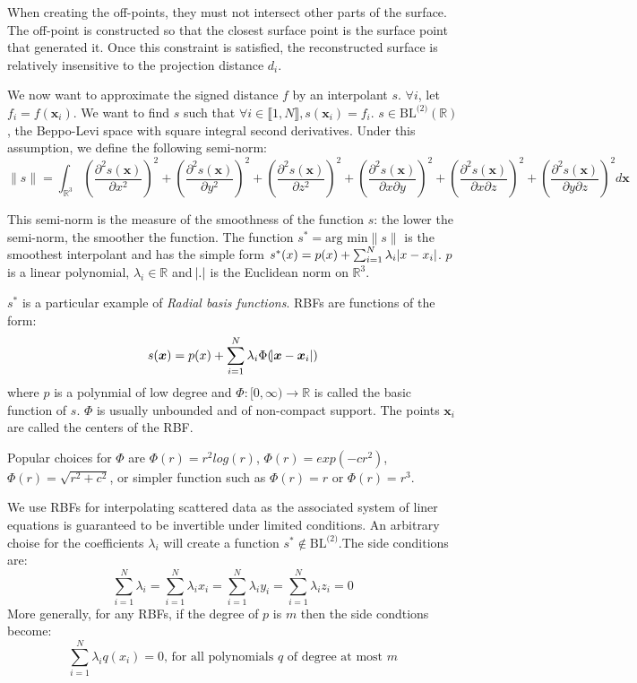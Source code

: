\documentclass[a4paper]{article}
\begin{document}
When creating the off-points, they must not intersect other parts of the surface. The off-point is constructed so that the closest surface point is the surface point that generated it. Once this constraint is satisfied, the reconstructed surface is relatively insensitive to the projection distance $d_i$.

We now want to approximate the signed distance $f$ by an interpolant $s$. $\forall i$, let $f_i = f(\boldsymbol{x}_i)$. We want to find $s$ such that $\forall i\in\llbracket 1,N\rrbracket, s(\boldsymbol{x}_i) = f_i$. $s \in \text{BL}^{\text{(2)}}(\mathbb{R})$, the Beppo-Levi space with square integral second derivatives. Under this assumption, we define the following semi-norm:
$$\|s\| = \int_{\mathbb{R}^3}\left(\frac{\partial^2s(\boldsymbol{x})}{\partial x^2}\right)^2 + \left(\frac{\partial^2s(\boldsymbol{x})}{\partial y^2}\right)^2 + \left(\frac{\partial^2s(\boldsymbol{x})}{\partial z^2}\right)^2 + \left(\frac{\partial^2s(\boldsymbol{x})}{\partial x\partial y}\right)^2 + \left(\frac{\partial^2s(\boldsymbol{x})}{\partial x\partial z}\right)^2 + \left(\frac{\partial^2s(\boldsymbol{x})}{\partial y\partial z}\right)^2 d\boldsymbol{x}$$

This semi-norm is the measure of the smoothness of the function $s$: the lower the semi-norm, the smoother the function. The function $s^* = \text{arg min} \|s\|$ is the smoothest interpolant and has the simple form $s^*(x) = p(x) + \sum_{i = 1}^{N}\lambda_i\abs{x - x_i}$. $p$ is a linear polynomial, $\lambda_i \in \mathbb{R}$ and $\abs{.}$ is the Euclidean norm on $\mathbb{R}^3$.

$s^*$ is a particular example of \emph{Radial basis functions}. RBFs are functions of the form:
$$s(\boldsymbol{x}) = p(x) + \sum_{i=1}^{N}\lambda_i\Phi(\abs{\boldsymbol{x} - \boldsymbol{x}_i})$$
where $p$ is a polynmial of low degree and $\Phi:[0,\infty) \to \mathbb{R}$ is called the basic function of $s$. $\Phi$ is usually unbounded and of non-compact support. The points $\boldsymbol{x}_i$ are called the centers of the RBF.

Popular choices for $\Phi$ are $\Phi(r) = r^2log(r)$, $\Phi(r) = exp(-cr^2)$, $\Phi(r) = \sqrt{r^2+c^2}$, or simpler function such as $\Phi(r) = r$ or $\Phi(r) = r^3$.

We use RBFs for interpolating scattered data as the associated system of liner equations is guaranteed to be invertible under limited conditions. An arbitrary choise for the coefficients $\lambda_i$ will create a function $s^* \notin \text{BL}^{\text{(2)}}$.The side conditions are:
$$\sum_{i = 1}^{N}\lambda_i =  \sum_{i = 1}^{N}\lambda_i x_i = \sum_{i = 1}^{N}\lambda_i y_i =\sum_{i = 1}^{N}\lambda_i z_i = 0$$
More generally, for any RBFs, if the degree of $p$ is $m$ then the side condtions become:
$$\sum_{i = 1}^{N}\lambda_i q(x_i) = 0\text{, for all polynomials }q\text{ of degree at most }m$$
\end{document}
